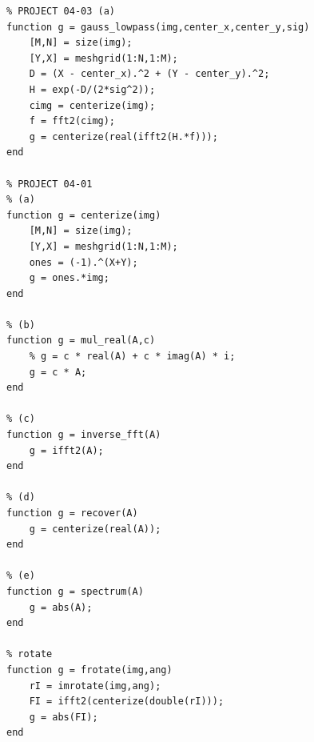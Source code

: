 \documentclass[logo,reportComp]{thesis}
\begin{document}
\begin{lstlisting}
% PROJECT 04-03 (a)
function g = gauss_lowpass(img,center_x,center_y,sig)
	[M,N] = size(img);
	[Y,X] = meshgrid(1:N,1:M);
	D = (X - center_x).^2 + (Y - center_y).^2;
	H = exp(-D/(2*sig^2));
	cimg = centerize(img);
	f = fft2(cimg);
	g = centerize(real(ifft2(H.*f)));
end

% PROJECT 04-01
% (a)
function g = centerize(img)
	[M,N] = size(img);
	[Y,X] = meshgrid(1:N,1:M);
	ones = (-1).^(X+Y);
	g = ones.*img;
end

% (b)
function g = mul_real(A,c)
	% g = c * real(A) + c * imag(A) * i;
	g = c * A;
end

% (c)
function g = inverse_fft(A)
	g = ifft2(A);
end

% (d)
function g = recover(A)
	g = centerize(real(A));
end

% (e)
function g = spectrum(A)
	g = abs(A);
end

% rotate
function g = frotate(img,ang)
	rI = imrotate(img,ang);
	FI = ifft2(centerize(double(rI)));
	g = abs(FI);
end
\end{lstlisting}
\end{document}
